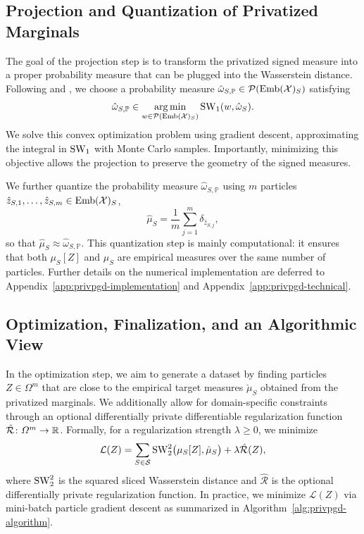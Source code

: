 \subsection{Projection and Quantization of Privatized Marginals}

The goal of the projection step is to transform the privatized signed measure into a proper probability measure that can be plugged into the Wasserstein distance. Following \citet{boedihardjo2022private} and \citet{donhauser2023certified}, we choose a probability measure \(\hat{\omega}_{S,\mathbb{P}} \in \mathcal{P}(\Emb(\mathcal{X})_S)\) satisfying
\[
  \hat{\omega}_{S,\mathbb{P}} \in \argmin_{w \in \mathcal{P}(\Emb(\mathcal{X})_S)} \SW_1(w,\hat{\omega}_S).
\]
We solve this convex optimization problem using gradient descent, approximating the integral in \(\SW_1\) with Monte Carlo samples. Importantly, minimizing this objective allows the projection to preserve the geometry of the signed measures.

We further quantize the probability measure \(\hat{\omega}_{S,\mathbb{P}}\) using \(m\) particles \(\hat z_{S,1},\dots,\hat z_{S,m} \in \Emb(\mathcal{X})_S\),
\[
  \hat{\mu}_S = \frac{1}{m}\sum_{j=1}^m \delta_{\hat z_{S,j}},
\]
so that \(\hat{\mu}_S \approx \hat{\omega}_{S,\mathbb{P}}\). This quantization step is mainly computational: it ensures that both \(\mu_S[Z]\) and \(\hat{\mu}_S\) are empirical measures over the same number of particles. Further details on the numerical implementation are deferred to Appendix~\ref{app:privpgd-implementation} and Appendix~\ref{app:privpgd-technical}.

\subsection{Optimization, Finalization, and an Algorithmic View}

In the optimization step, we aim to generate a dataset by finding particles \(Z \in \Omega^m\) that are close to the empirical target measures \(\hat{\mu}_S\) obtained from the privatized marginals. We additionally allow for domain-specific constraints through an optional differentially private differentiable regularization function \(\hat{\mathcal{R}}\colon \Omega^m \to \RR\). Formally, for a regularization strength \(\lambda \geq 0\), we minimize
\[
  \mathcal{L}(Z)
  =
  \sum_{S \in \mathcal{S}}
  \SW_2^2\bigl(\mu_S[Z],\hat{\mu}_S\bigr)
  +
  \lambda \hat{\mathcal{R}}(Z),
\]
where \(\SW_2^2\) is the squared sliced Wasserstein distance and \(\hat{\mathcal{R}}\) is the optional differentially private regularization function. In practice, we minimize \(\mathcal{L}(Z)\) via mini-batch particle gradient descent as summarized in Algorithm~\ref{alg:privpgd-algorithm}.

